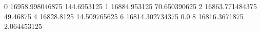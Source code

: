 0 16958.998046875 144.6953125
1 16884.953125 70.650390625
2 16863.771484375 49.46875
4 16828.8125 14.509765625
6 16814.302734375 0.0
8 16816.3671875 2.064453125
